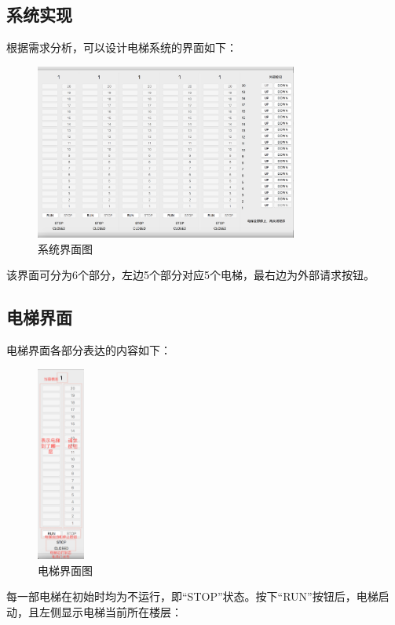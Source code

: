 \documentclass{article}
\begin{document}
\begin{CJK}{UTF8}{gbsn}
\clearpage

\section{系统实现}
根据需求分析，可以设计电梯系统的界面如下：
\begin{figure}[!h]
\centering
\includegraphics[width=0.77\textwidth]{2.png}
\caption{系统界面图}
\end{figure}

该界面可分为6个部分，左边5个部分对应5个电梯，最右边为外部请求按钮。

\subsection{电梯界面}
电梯界面各部分表达的内容如下：
\begin{figure}[!h]
\centering
\includegraphics[width=0.14\textwidth]{3.png}
\caption{电梯界面图}
\end{figure}

\clearpage
每一部电梯在初始时均为不运行，即“STOP”状态。按下“RUN”按钮后，电梯启动，且左侧显示电梯当前所在楼层：


\end{CJK}
\end{document}
